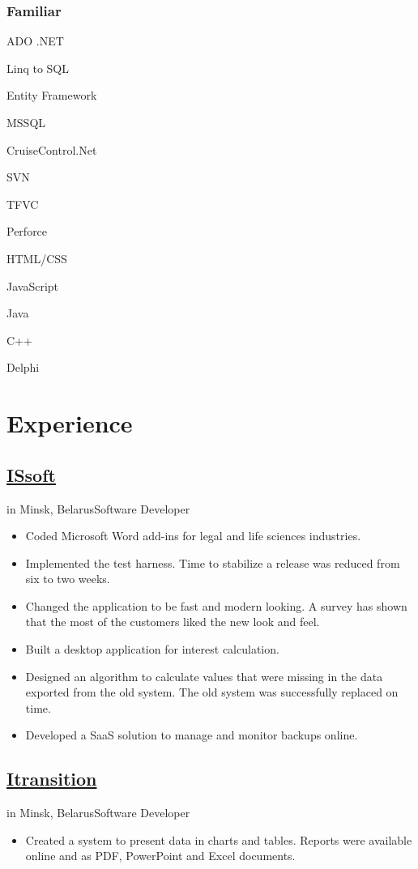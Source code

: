 \documentclass[a4paper,11pt]{article}
\newcommand{\minsk}{Minsk, Belarus}
\newcommand{\periodinminsk}[1]{{\footnotesize #1 in \minsk}}
\newcommand{\jobattributes}[1]{\periodinminsk{#1}{\footnotesize \newline Software Developer}}
\begin{document}
\begin{minipage}[t]{0.34\textwidth}
    \subsubsection*{Familiar}
    \begin{inparaitem}
      \item ADO .NET 
      \item Linq to SQL
      \item Entity Framework
      \item MSSQL
      \item CruiseControl.Net
      \item SVN
      \item TFVC
      \item Perforce
      \item HTML/CSS
      \item JavaScript
      \item Java
      \item C++
      \item Delphi
    \end{inparaitem}
  \end{minipage}
  \hfill
  \begin{minipage}[t]{0.55\textwidth}
    \section*{Experience}
    \subsection*{\href{http://www.issoft.by/}{ISsoft}}
    \jobattributes{}
    \begin{itemize}
      \item Coded Microsoft Word add-ins for legal and life sciences industries.
      \item Implemented the test harness. Time to stabilize a release was reduced from six to two weeks.
      \item Changed the application to be fast and modern looking. A survey has shown that the most of the customers liked the new look and feel.
      \item Built a desktop application for interest calculation.
      \item Designed an algorithm to calculate values that were missing in the data exported from the old system. The old system was successfully replaced on time.
      \item Developed a SaaS solution to manage and monitor backups online.
    \end{itemize}
    \subsection*{\href{http://www.itransition.com/}{Itransition}}
    \jobattributes{}
    \begin{itemize}
      \item Created a system to present data in charts and tables. Reports were available online and as PDF, PowerPoint and Excel documents.
    \end{itemize}
  \end{minipage}
\end{document}
